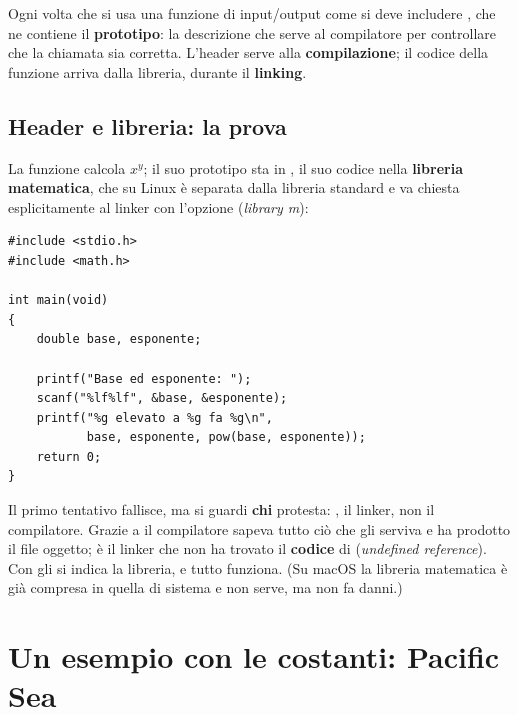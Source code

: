 Ogni volta che si usa una funzione di input/output come  si
deve includere , che ne contiene il \textbf{prototipo}: la
descrizione che serve al compilatore per controllare che la chiamata sia
corretta. L'header serve alla \textbf{compilazione}; il codice della
funzione arriva dalla libreria, durante il \textbf{linking}.

\subsection{Header e libreria: la prova}

La funzione  calcola $x^y$; il suo prototipo sta in
, il suo codice nella \textbf{libreria matematica}, che su
Linux è separata dalla libreria standard e va chiesta esplicitamente al
linker con l'opzione  (\textit{library m}):

\begin{affianco}[0.48]
\begin{lstlisting}[style=c, name=potenza.c]
#include <stdio.h>
#include <math.h>

int main(void)
{
    double base, esponente;

    printf("Base ed esponente: ");
    scanf("%lf%lf", &base, &esponente);
    printf("%g elevato a %g fa %g\n",
           base, esponente, pow(base, esponente));
    return 0;
}
\end{lstlisting}
\risultato
{}
\end{affianco}

Il primo tentativo fallisce, ma si guardi \textbf{chi} protesta:
, il linker, non il compilatore. Grazie a  il
compilatore sapeva tutto ciò che gli serviva e ha prodotto il file oggetto;
è il linker che non ha trovato il \textbf{codice} di 
(\textit{undefined reference}). Con  gli si indica la libreria, e
tutto funziona. (Su macOS la libreria matematica è già compresa in quella
di sistema e  non serve, ma non fa danni.)

\section{Un esempio con le costanti: Pacific Sea}

